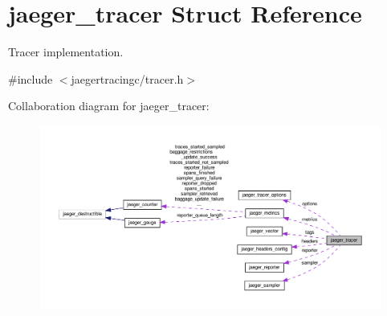 \hypertarget{structjaeger__tracer}{}\section{jaeger\+\_\+tracer Struct Reference}
\label{structjaeger__tracer}


Tracer implementation.  




{\ttfamily \#include $<$jaegertracingc/tracer.\+h$>$}



Collaboration diagram for jaeger\+\_\+tracer\+:\nopagebreak
\begin{figure}[H]
\begin{center}
\leavevmode
\includegraphics[width=350pt]{structjaeger__tracer__coll__graph}
\end{center}
\end{figure}
